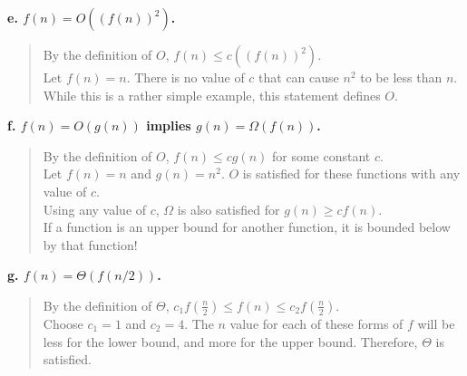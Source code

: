 \documentclass{article}
\begin{document}
\textbf{e. $f(n) = O((f(n))^{2})$.\\}
\begin{quote}
\textsf{By the definition of $O$, $f(n) \leq c((f(n))^{2})$.\\
Let $f(n) = n$. There is no value of $c$ that can cause $n^{2}$ to be less than $n$. While this is a rather
simple example, this statement defines $O$.\\}
\end{quote}

\textbf{f. $f(n) = O(g(n))$ implies $g(n) = \Omega(f(n))$.\\}
\begin{quote}
\textsf{By the definition of $O$, $f(n) \leq cg(n)$ for some constant $c$.\\
Let $f(n) = n$ and $g(n) = n^{2}$. $O$ is satisfied for these functions with any value of $c$.\\
Using any value of $c$, $\Omega$ is also satisfied for $g(n) \geq cf(n)$.\\
If a function is an upper bound for another function, it is bounded below by that function!\\}
\end{quote}

\textbf{g. $f(n) = \Theta(f(n/2))$.\\}
\begin{quote}
\textsf{By the definition of $\Theta$, $c_{1}f(\frac{n}{2}) \leq f(n) \leq c_{2}f(\frac{n}{2})$.\\
Choose $c_{1} = 1$ and $c_{2} = 4$. The $n$ value for each of these forms of $f$ will be less for
the lower bound, and more for the upper bound. Therefore, $\Theta$ is satisfied.\\}
\end{quote}
\end{document}
